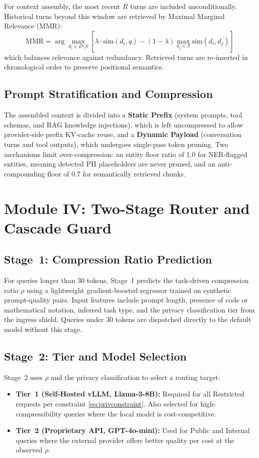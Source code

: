 \documentclass[conference]{IEEEtran}
\begin{document}
For context assembly, the most recent $R$ turns are included unconditionally. Historical turns beyond this window are retrieved by Maximal Marginal Relevance (MMR):
\begin{equation}
\text{MMR} = \arg\max_{d_i \in D \setminus S}\!\!\left[\lambda \cdot \text{sim}(d_i, q) - (1\!-\!\lambda)\!\!\max_{d_j \in S}\!\text{sim}(d_i, d_j)\right]
\label{eq:mmr}
\end{equation}
which balances relevance against redundancy. Retrieved turns are re-inserted in chronological order to preserve positional semantics.

\subsection{Prompt Stratification and Compression}
The assembled context is divided into a \textbf{Static Prefix} (system prompts, tool schemas, and RAG knowledge injections), which is left uncompressed to allow provider-side prefix KV-cache reuse, and a \textbf{Dynamic Payload} (conversation turns and tool outputs), which undergoes single-pass token pruning. Two mechanisms limit over-compression: an entity floor ratio of 1.0 for NER-flagged entities, meaning detected PII placeholders are never pruned, and an anti-compounding floor of 0.7 for semantically retrieved chunks.

\section{Module IV: Two-Stage Router and Cascade Guard}

\subsection{Stage~1: Compression Ratio Prediction}
For queries longer than 30 tokens, Stage~1 predicts the task-driven compression ratio $\rho$ using a lightweight gradient-boosted regressor trained on synthetic prompt-quality pairs. Input features include prompt length, presence of code or mathematical notation, inferred task type, and the privacy classification tier from the ingress shield. Queries under 30 tokens are dispatched directly to the default model without this stage.

\subsection{Stage~2: Tier and Model Selection}
Stage~2 uses $\rho$ and the privacy classification to select a routing target:
\begin{itemize}
    \item \textbf{Tier~1 (Self-Hosted vLLM, Llama-3-8B):} Required for all Restricted requests per constraint \eqref{eq:privconstraint}. Also selected for high-compressibility queries where the local model is cost-competitive.
    \item \textbf{Tier~2 (Proprietary API, GPT-4o-mini):} Used for Public and Internal queries where the external provider offers better quality per cost at the observed $\rho$.
\end{itemize}
\end{document}
